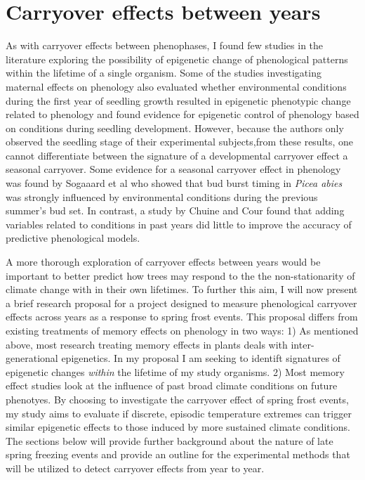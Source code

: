 \documentclass{article}\usepackage[]{graphicx}\usepackage[]{color}
\begin{document}
\section{Carryover effects between years}
\par As with carryover effects between phenophases, I found few studies in the literature exploring the possibility of epigenetic change of phenological patterns within the lifetime of a single organism.
Some of the studies investigating maternal effects on phenology also evaluated whether environmental conditions during the first year of seedling growth resulted in epigenetic phenotypic change related to phenology \citep{Gomory2014} and found evidence for epigenetic control of phenology based on conditions during seedling development. However, because the authors only observed the seedling stage of their experimental subjects,from these results, one cannot differentiate between the signature of a developmental carryover effect a seasonal carryover. Some evidence for a seasonal carryover effect in phenology was found by Sogaaard et al \citeyear{Sogaard2008} who showed that  bud burst timing in \textit{Picea abies} was strongly influenced by environmental conditions during the previous summer's bud set. In contrast, a study by Chuine and Cour \citeyear{Chuine1999} found that adding variables related to conditions in past years did little to improve the accuracy of predictive phenological models.
\par A more thorough exploration of carryover effects between years would be important to better predict how trees may respond to the the non-stationarity of climate change with in their own lifetimes. To further this aim, I will now present a brief research proposal for a project designed to measure phenological carryover effects across years as a response to spring frost events. This proposal differs from existing treatments of memory effects on phenology in two ways:
1) As mentioned above, most research treating memory effects in plants deals with inter-generational epigenetics. In my proposal I am seeking to identift signatures of epigenetic changes \textit{within} the lifetime of my study organisms.
2) Most memory effect studies look at the influence of past broad climate conditions on future phenotyes. By choosing to investigate the carryover effect of spring frost events, my study aims to evaluate if discrete, episodic temperature extremes can trigger similar epigenetic effects to those induced by more sustained climate conditions. The sections below will provide further background about the nature of late spring freezing events and provide an outline for the experimental methods that will be utilized to detect carryover effects from year to year.
\end{document}
